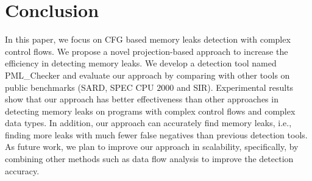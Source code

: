 \section{Conclusion}\label{sec:conclusion}

In this paper, we focus on CFG based memory leaks detection with complex control flows. We propose a novel projection-based approach to increase the efficiency in detecting memory leaks. We develop a detection tool named PML\_Checker and evaluate our approach by comparing with other tools on public benchmarks (SARD, SPEC CPU $2000$ and SIR). Experimental results show that our approach has better effectiveness than other approaches in detecting memory leaks on programs with complex control flows and complex data types. In addition, our approach can accurately find memory leaks, i.e., finding more leaks with much fewer false negatives than previous detection tools. As future work, we plan to improve our approach in scalability, specifically, by combining other methods such as data flow analysis to improve the detection accuracy.

